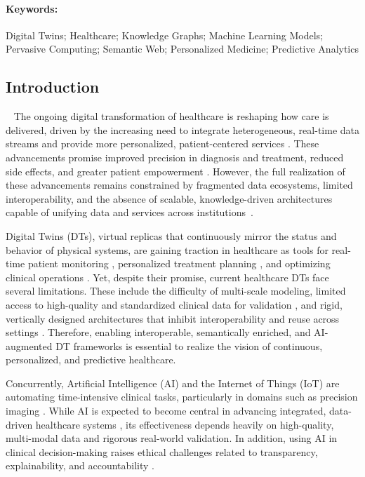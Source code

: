 \paragraph{Keywords:} Digital Twins; Healthcare; Knowledge Graphs; Machine Learning Models; Pervasive Computing; Semantic Web; Personalized Medicine; Predictive Analytics

\subsection{Introduction}~\label{paper6_introduction}
The ongoing digital transformation of healthcare is reshaping how care is delivered, driven by the increasing need to integrate heterogeneous, real-time data streams and provide more personalized, patient-centered services \cite{engstrom_impact_2023,amri_data-driven_2023}. These advancements promise improved precision in diagnosis and treatment, reduced side effects, and greater patient empowerment \cite{engstrom_impact_2023,cailleaux_fused_2021}.
However, the full realization of these advancements remains constrained by fragmented data ecosystems, limited interoperability, and the absence of scalable, knowledge-driven architectures capable of unifying data and services across institutions~\cite{mumtaz_current_2023}.

Digital Twins (DTs), virtual replicas that continuously mirror the status and behavior of physical systems, are gaining traction in healthcare as tools for real-time patient monitoring \cite{johnson_digital_2024}, personalized treatment planning \cite{vallee_digital_2023}, and optimizing clinical operations \cite{sun_digital_2023}. Yet, despite their promise, current healthcare DTs face several limitations. These include the difficulty of multi-scale modeling, limited access to high-quality and standardized clinical data for validation \cite{arcobelli2024fhir,marfoglia_towards_2025}, and rigid, vertically designed architectures that inhibit interoperability and reuse across settings \cite{9325551_ricci}.
Therefore, enabling interoperable, semantically enriched, and AI-augmented DT frameworks is essential to realize the vision of continuous, personalized, and predictive healthcare.

Concurrently, Artificial Intelligence (AI) and the Internet of Things (IoT) are automating time-intensive clinical tasks, particularly in domains such as precision imaging \cite{johnson_precision_2021}. While AI is expected to become central in advancing integrated, data-driven healthcare systems \cite{gupta_artificial_2021}, its effectiveness depends heavily on high-quality, multi-modal data and rigorous real-world validation. In addition, using AI in clinical decision-making raises ethical challenges related to transparency, explainability, and accountability \cite{sun_ai_2023}.

